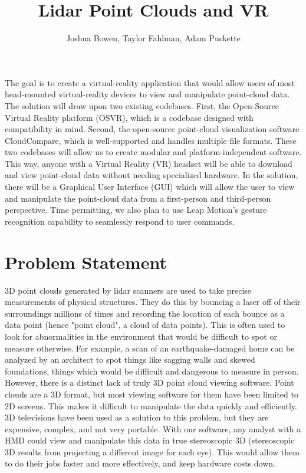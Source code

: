 \documentclass{article}
\begin{document}
\title{Lidar Point Clouds and VR}
\author{Joshua Bowen, Taylor Fahlman, Adam Puckette}

\maketitle

\abstract

The goal is to create a virtual-reality application that would allow users of most head-mounted virtual-reality devices to view and manipulate point-cloud data. The solution will draw upon two existing codebases. First, the Open-Source Virtual Reality platform (OSVR), which is a codebase designed with compatibility in mind. Second, the open-source point-cloud visualization software CloudCompare, which is well-supported and handles multiple file formats. These two codebases will allow us to create modular and platform-independent software. This way, anyone with a Virtual Reality (VR) headset will be able to download and view point-cloud data without needing specialized hardware. In the solution, there will be a Graphical User Interface (GUI) which will allow the user to view and manipulate the point-cloud data from a first-person and third-person perspective. Time permitting, we also plan to use Leap Motion's gesture recognition capability to seamlessly respond to user commands.

\newpage
\thispagestyle{empty}
\mbox{}
\section*{Problem Statement}

3D point clouds generated by lidar scanners are used to take precise measurements of physical structures. They do this by bouncing a laser off of their surroundings millions of times and recording the location of each bounce as a data point (hence "point cloud", a cloud of data points). This is often used to look for abnormalities in the environment that would be difficult to spot or measure otherwise. For example, a scan of an earthquake-damaged home can be analyzed by an architect to spot things like sagging walls and skewed foundations, things which would be difficult and dangerous to measure in person. However, there is a distinct lack of truly 3D point cloud viewing software. Point clouds are a 3D format, but most viewing software for them have been limited to 2D screens. This makes it difficult to manipulate the data quickly and efficiently. 3D televisions have been used as a solution to this problem, but they are expensive, complex, and not very portable. With our software, any analyst with a HMD could view and manipulate this data in true stereoscopic 3D (stereoscopic 3D results from projecting a different image for each eye). This would allow them to do their jobs faster and more effectively, and keep hardware costs down. 
\end{document}
